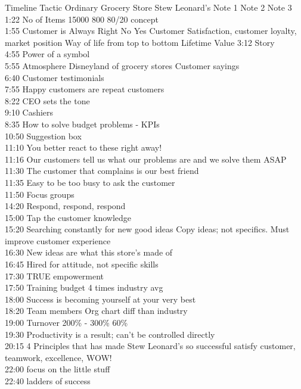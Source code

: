 \documentclass[
]{book}
\begin{document}
Timeline Tactic Ordinary Grocery Store Stew Leonard's Note 1 Note 2 Note 3
1:22 No of Items 15000 800 80/20 concept\\
1:55 Customer is Always Right No Yes Customer Satisfaction, customer loyalty, market position Way of life from top to bottom Lifetime Value
3:12 Story\\
4:55 Power of a symbol\\
5:55 Atmosphere Disneyland of grocery stores Customer sayings\\
6:40 Customer testimonials\\
7:55 Happy customers are repeat customers\\
8:22 CEO sets the tone\\
9:10 Cashiers\\
8:35 How to solve budget problems - KPIs\\
10:50 Suggestion box\\
11:10 You better react to these right away!\\
11:16 Our customers tell us what our problems are and we solve them ASAP\\
11:30 The customer that complains is our best friend\\
11:35 Easy to be too busy to ask the customer\\
11:50 Focus groups\\
14:20 Respond, respond, respond\\
15:00 Tap the customer knowledge\\
15:20 Searching constantly for new good ideas Copy ideas; not specifics. Must improve customer experience\\
16:30 New ideas are what this store's made of\\
16:45 Hired for attitude, not specific skills\\
17:30 TRUE empowerment\\
17:50 Training budget 4 times industry avg\\
18:00 Success is becoming yourself at your very best\\
18:20 Team members Org chart diff than industry\\
19:00 Turnover 200\% - 300\% 60\%\\
19:30 Productivity is a result; can't be controlled directly\\
20:15 4 Principles that has made Stew Leonard's so successful satisfy customer, teamwork, excellence, WOW!\\
22:00 focus on the little stuff\\
22:40 ladders of success\\
\end{document}
